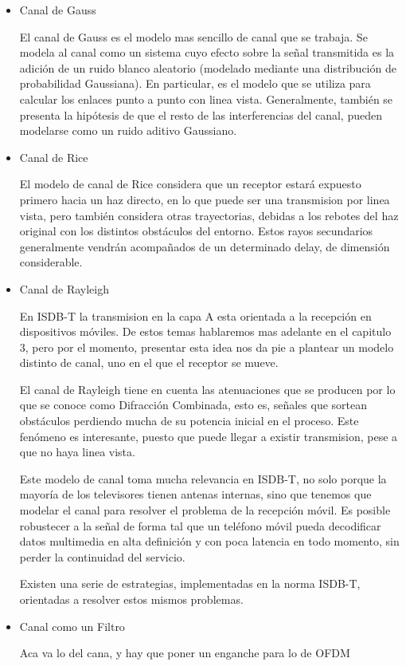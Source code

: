 \begin{itemize}
	\item Canal de Gauss
	
El canal de Gauss es el modelo mas sencillo de canal que se trabaja. Se modela al canal como un sistema cuyo efecto sobre la señal transmitida es la adición de un ruido blanco aleatorio (modelado mediante una distribución de probabilidad Gaussiana). En particular, es el modelo que se utiliza para calcular los enlaces punto a punto con linea vista. Generalmente, también se presenta la hipótesis de que el resto de las interferencias del canal, pueden modelarse como un ruido aditivo Gaussiano.
	
	\item Canal de Rice

El modelo de canal de Rice considera que un receptor estará expuesto primero hacia un haz directo, en lo que puede ser una transmision por linea vista, pero también considera otras trayectorias, debidas a los rebotes del haz original con los distintos obstáculos del entorno. Estos rayos secundarios generalmente vendrán acompañados de un determinado delay, de dimensión considerable.

	\item Canal de Rayleigh

En ISDB-T la transmision en la capa A esta orientada a la recepción en dispositivos móviles. De estos temas hablaremos mas adelante en el capitulo 3, pero por el momento, presentar esta idea nos da pie a plantear un modelo distinto de canal, uno en el que el receptor se mueve. 

El canal de Rayleigh tiene en cuenta las atenuaciones que se producen por lo que se conoce como Difracción Combinada, esto es, señales que sortean obstáculos perdiendo mucha de su potencia inicial en el proceso. Este fenómeno es interesante, puesto que puede llegar a existir transmision, pese a que no haya linea vista. 

Este modelo de canal toma mucha relevancia en ISDB-T, no solo porque la mayoría de los televisores tienen antenas internas, sino que tenemos que modelar el canal para resolver el problema de la recepción móvil. Es posible robustecer a la señal de forma tal que un teléfono móvil pueda decodificar datos multimedia en alta definición y con poca latencia en todo momento, sin perder la continuidad del servicio. 

Existen una serie de estrategias, implementadas en la norma ISDB-T, orientadas a resolver estos mismos problemas.

	\item Canal como un Filtro
	
	Aca va lo del cana, y hay que poner un enganche para lo de OFDM
\end{itemize}

